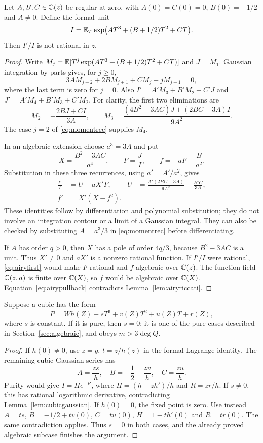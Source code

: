 \begin{lemma}\label{lem:cubicgaussian}
Let $A,B,C\in\mathbb C(z)$ be regular at zero, with $A(0)=C(0)=0$,
$B(0)=-1/2$ and $A\ne0$. Define the formal unit
\[
 I=\mathbb E_T\exp\bigl(AT^3+(B+1/2)T^2+CT\bigr).
\]
Then $I'/I$ is not rational in $z$.
\end{lemma}
\begin{proof}
Write $M_j=\mathbb E[T^j\exp(AT^3+(B+1/2)T^2+CT)]$ and $J=M_1$.
Gaussian integration by parts gives, for $j\geq0$,
\begin{equation}\label{eq:momentrec}
 3A M_{j+2}+2B M_{j+1}+C M_j+jM_{j-1}=0,
\end{equation}
where the last term is zero for $j=0$. Also
$I'=A'M_3+B'M_2+C'J$ and $J'=A'M_4+B'M_3+C'M_2$.
For clarity, the first two eliminations are
\[
 M_2=-\frac{2BJ+CI}{3A},\qquad
 M_3=\frac{(4B^2-3AC)J+(2BC-3A)I}{9A^2}.
\]
The case $j=2$ of \eqref{eq:momentrec} supplies $M_4$.

In an algebraic extension choose $a^3=3A$ and put
\[
 X=\frac{B^2-3AC}{a^4},\qquad F=\frac JI,
 \qquad f=-aF-\frac B{a^2}.
\]
Substitution in these three recurrences, using $a'=A'/a^2$, gives
\begin{align}
 \frac{I'}I&=U-aX'F,
 &U&=\frac{A'(2BC-3A)}{9A^2}-\frac{B'C}{3A},\label{eq:airyfirst}\\
 f'&=X'(X-f^2).\label{eq:airypullback}
\end{align}
These identities follow by differentiation and polynomial substitution;
they do not involve an integration contour or a limit of a Gaussian
integral. They can also be checked by substituting $A=a^3/3$ in
\eqref{eq:momentrec} before differentiating.

If $A$ has order $q>0$, then $X$ has a pole of order $4q/3$,
because $B^2-3AC$ is a unit. Thus $X'\ne0$ and $aX'$ is a nonzero
rational function. If $I'/I$ were rational, \eqref{eq:airyfirst}
would make $F$ rational and $f$ algebraic over $\mathbb C(z)$. The function
field $\mathbb C(z,a)$ is finite over $\mathbb C(X)$, so $f$ would be algebraic
over $\mathbb C(X)$. Equation~\eqref{eq:airypullback} contradicts
Lemma~\ref{lem:airyriccati}.
\end{proof}

\begin{proposition}\label{prop:height}
Suppose a cubic has the form
\[
 P=Wh(Z)+sT^3+v(Z)T^2+u(Z)T+r(Z),
\]
where $s$ is constant. If it is pure, then $s=0$; it is one of the
pure cases described in Section~\ref{sec:algebraic}, and obeys
$m>3\deg Q$.
\end{proposition}
\begin{proof}
If $h(0)\ne0$, use $z=g$, $t=z/h(z)$ in the formal Lagrange
identity. The remaining cubic Gaussian series has
\[
 A=\frac{zs}{h},\quad B=-\frac12+\frac{zv}{h},\quad C=\frac{zu}{h}.
\]
Purity would give $I=H e^{-R}$, where
$H=(h-zh')/h$ and $R=zr/h$. If $s\ne0$, this has rational
logarithmic derivative, contradicting Lemma~\ref{lem:cubicgaussian}.
If $h(0)=0$, the fixed point is zero. Use instead
$A=ts$, $B=-1/2+tv(0)$, $C=tu(0)$, $H=1-th'(0)$ and $R=tr(0)$.
The same contradiction applies. Thus $s=0$ in both cases, and the
already proved algebraic subcase finishes the argument.
\end{proof}

